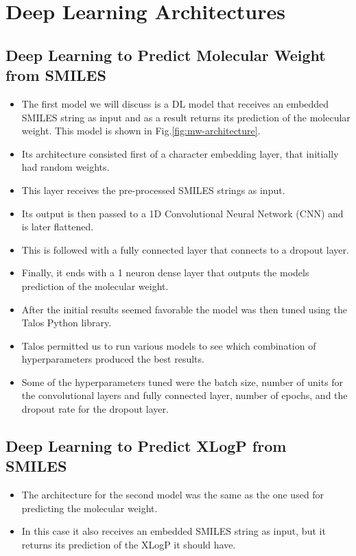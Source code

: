 \section{Deep Learning Architectures \label{archi}}
    \subsection{Deep Learning to Predict Molecular Weight from SMILES}
        \begin{itemize}
            \item The first model we will discuss is a DL model that receives an embedded SMILES string as input and as a result returns its prediction of the molecular weight. This model is shown in Fig.\ref{fig:mw-architecture}.
            \item Its architecture consisted first of a character embedding layer, that initially had random weights.
            \item This layer receives the pre-processed SMILES strings as input.
            \item Its output is then passed to a 1D Convolutional Neural Network (CNN) and is later flattened.
            \item This is followed with a fully connected layer that connects to a dropout layer.
            \item Finally, it ends with a 1 neuron dense layer that outputs the models prediction of the molecular weight.
            \item After the initial results seemed favorable the model was then tuned using the Talos Python library.
            \item Talos permitted us to run various models to see which combination of hyperparameters produced the best results.
            \item Some of the hyperparameters tuned were the batch size, number of units for the convolutional layers and fully connected layer, number of epochs, and the dropout rate for the dropout layer.
        \end{itemize}
    \subsection{Deep Learning to Predict XLogP from SMILES}
        \begin{itemize}
            \item The architecture for the second model was the same as the one used for predicting the molecular weight.
            \item In this case it also receives an embedded SMILES string as input, but it returns its prediction of the XLogP it should have.
        \end{itemize}

